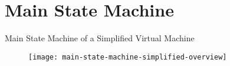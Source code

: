 
\section{Main State Machine}



\begin{frame}{Main State Machine of a Simplified Virtual Machine}
\begin{figure}
	\texttt{[image: main-state-machine-simplified-overview]}
\end{figure}
\end{frame}
















